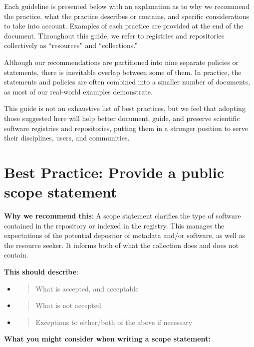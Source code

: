 \documentclass[]{article}
\begin{document}
Each guideline is presented below with an explanation as to why we
recommend the practice, what the practice describes or contains, and
specific considerations to take into account. Examples of each practice
are provided at the end of the document. Throughout this guide, we refer
to registries and repositories collectively as ``resources'' and
``collections.''

Although our recommendations are partitioned into nine separate policies
or statements, there is inevitable overlap between some of them. In
practice, the statements and policies are often combined into a smaller
number of documents, as most of our real-world examples demonstrate.

This guide is not an exhaustive list of best practices, but we feel that
adopting those suggested here will help better document, guide, and
preserve scientific software registries and repositories, putting them
in a stronger position to serve their disciplines, users, and
communities.

\newpage
\section{Best Practice: Provide a public scope
statement}\label{best-practice-provide-a-public-scope-statement}

\textbf{Why we recommend this}: A scope statement clarifies the type of
software contained in the repository or indexed in the registry. This
manages the expectations of the potential depositor of metadata and/or
software, as well as the resource seeker. It informs both of what the
collection does and does not contain.

\textbf{This should describe}:

\begin{itemize}
\item
  \begin{quote}
  What is accepted, and acceptable
  \end{quote}
\item
  \begin{quote}
  What is not accepted
  \end{quote}
\item
  \begin{quote}
  Exceptions to either/both of the above if necessary
  \end{quote}
\end{itemize}

\textbf{What you might consider when writing a scope statement: }
\end{document}
